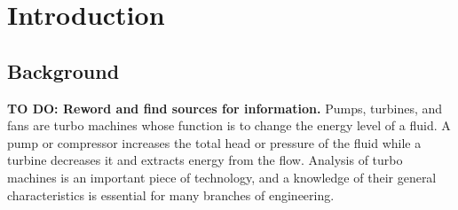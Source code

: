 
\section{Introduction}
\subsection{Background}
\textbf{TO DO: Reword and find sources for information.}
Pumps, turbines, and fans are turbo machines whose function is to change the energy level of a fluid. A pump or compressor increases the total head or pressure of the fluid while a turbine decreases it and extracts energy from the flow. Analysis of turbo machines is an important piece of technology, and a knowledge of their general characteristics is essential for many branches of engineering. 

